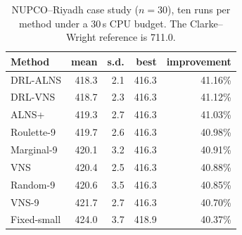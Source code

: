 \begin{table}[tb]
\centering
\caption{NUPCO--Riyadh case study ($n=30$), ten runs per method under a 30\,s CPU budget. The Clarke--Wright reference is 711.0.}
\label{tab:case}
\small
\begin{tabular}{@{}lrrrr@{}}
\toprule
Method & mean & s.d. & best & improvement \\
\midrule
DRL-ALNS & 418.3 & 2.1 & 416.3 & 41.16\% \\
DRL-VNS & 418.7 & 2.3 & 416.3 & 41.12\% \\
ALNS+ & 419.3 & 2.7 & 416.3 & 41.03\% \\
Roulette-9 & 419.7 & 2.6 & 416.3 & 40.98\% \\
Marginal-9 & 420.1 & 3.2 & 416.3 & 40.91\% \\
VNS & 420.4 & 2.5 & 416.3 & 40.88\% \\
Random-9 & 420.6 & 3.5 & 416.3 & 40.85\% \\
VNS-9 & 421.7 & 2.7 & 416.3 & 40.70\% \\
Fixed-small & 424.0 & 3.7 & 418.9 & 40.37\% \\
\bottomrule
\end{tabular}
\end{table}

